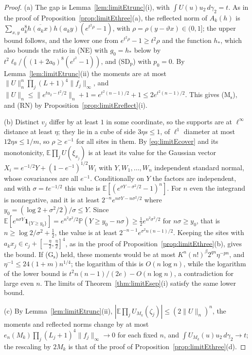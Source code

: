\documentclass[aps,prd,twocolumn,superscriptaddress,nofootinbib,longbibliography,floatfix,amsmath,amssymb,10pt]{revtex4-2}
\theoremstyle{definition}
\theoremstyle{remark}
\newcommand{\E}{\mathbb{E}}
\begin{document}
\begin{proof}
(a) The gap is Lemma~\ref{lem:limitEtrunc}(i), with $\int U(u)u_2\,d\gamma_2
=t$. As in the proof of Proposition~\ref{prop:limitEthree}(a), the
reflected norm of $A_k(h)$ is $\sum_{x,y}a_k^8\overline{h(a_kx)}h(a_ky)
(e^{t^2\rho}-1)$, with $\rho=\rho(y-\vartheta x)\in(0,1]$; the upper bound
follows, and the lower one from $e^{t^2\rho}-1\ge t^2\rho$ and the function
$h_*$, which also bounds the ratio in (NE) with $g_0=h_*$ below by
$t^2\ell_0/((1+2a_0)^8(e^{t^2}-1))$, and (SD$_{\mathrm p}$) with $p_0=0$. By
Lemma~\ref{lem:limitEtrunc}(ii) the moments are at most $\|U\|_n^n\prod_j
(L+1)^4\|f_j\|_\infty$, and $\|U\|_n\le\|e^{tu_2-t^2/2}\|_n+1=e^{t^2(n-1)/2}
+1\le2e^{t^2(n-1)/2}$. This gives (M$_{\mathrm s}$), and (RN) by
Proposition~\ref{prop:limitEreflect}(i).

(b) Distinct $v_j$ differ by at least $1$ in some coordinate, so the supports
are at $\ell^\infty$ distance at least $\eta$; they lie in a cube of side
$3\eta s\le1$, of $\ell^1$ diameter at most $12\eta s\le1/m$, so
$\rho\ge e^{-1}$ for all sites in them. By \eqref{eq:limitEcover} and its
monotonicity, $\E\prod_jU(\xi_{x_j})$ is at least its value for the
Gaussian vector $X_i=e^{-1/2}Y+(1-e^{-1})^{1/2}W_i$ with $Y,W_1,\dots,W_n$
independent standard normal, whose covariances are all $e^{-1}$.
Conditionally on $Y$ the factors are independent, and with
$\sigma=te^{-1/2}$ this value is $\E[(e^{\sigma Y-\sigma^2/2}-1)^n]$. For
$n$ even the integrand is nonnegative, and it is at least
$2^{-n}e^{n\sigma Y-n\sigma^2/2}$ where $y_0=(\log2+\sigma^2/2)/\sigma\le
Y$. Since $\E[e^{n\sigma Y}\mathbf 1_{\{Y\ge y_0\}}]=e^{n^2\sigma^2/2}
\mathbb P(Y\ge y_0-n\sigma)\ge\frac12e^{n^2\sigma^2/2}$ for $n\sigma\ge
y_0$, that is $n\ge\log2/\sigma^2+\frac12$, the value is at least
$2^{-n-1}e^{\sigma^2n(n-1)/2}$. Keeping the sites with $a_kx_j\in
c_j+[-\frac\eta2,\frac\eta2]^4$, as in the proof of
Proposition~\ref{prop:limitEthree}(b), gives the bound. If
(G$_{\mathrm s}$) held, these moments would be at most $K^n(n!)^\beta
2^{qn}\eta^{-pn}$, and $\eta^{-1}\le24(1+m)n^{1/4}$; the logarithm of this
is $O(n\log n)$, while the logarithm of the lower bound is $t^2n(n-1)/(2e)-
O(n\log n)$, a contradiction for large even $n$. The limits of
Theorem~\ref{thm:limitEsep}(i) satisfy the same lower bound.

(c) By Lemma~\ref{lem:limitEtrunc}(ii), $|\E\prod_jU_{M_k}(\zeta_j)|\le
(2\|U\|_n)^n$, the moments and reflected norms change by at most
$e_n(M_k)\prod_j(L_j+1)^4\|f_j\|_\infty\to0$ for each fixed $n$, and
$\int U_{M_k}(u)u_2\,d\gamma_2\to t$; the rescaling by $2M_k$ is that of the
proof of Proposition~\ref{prop:limitEthree}(d).
\end{proof}
\end{document}
